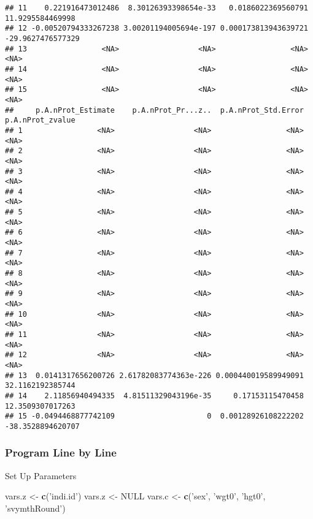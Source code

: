 \documentclass[
]{book}
\newenvironment{Shaded}{\begin{snugshade}}{\end{snugshade}}
\newcommand{\KeywordTok}[1]{\textcolor[rgb]{0.13,0.29,0.53}{\textbf{#1}}}
\newcommand{\NormalTok}[1]{#1}
\newcommand{\OtherTok}[1]{\textcolor[rgb]{0.56,0.35,0.01}{#1}}
\newcommand{\StringTok}[1]{\textcolor[rgb]{0.31,0.60,0.02}{#1}}
\begin{document}
\begin{verbatim}
## 11    0.221916473012486  8.30126393398654e-33   0.0186022369560791  11.9295584469998
## 12 -0.00520794333267238 3.00201194005694e-197 0.000173813943639721 -29.9627476577329
## 13                 <NA>                  <NA>                 <NA>              <NA>
## 14                 <NA>                  <NA>                 <NA>              <NA>
## 15                 <NA>                  <NA>                 <NA>              <NA>
##     p.A.nProt_Estimate    p.A.nProt_Pr...z..  p.A.nProt_Std.Error  p.A.nProt_zvalue
## 1                 <NA>                  <NA>                 <NA>              <NA>
## 2                 <NA>                  <NA>                 <NA>              <NA>
## 3                 <NA>                  <NA>                 <NA>              <NA>
## 4                 <NA>                  <NA>                 <NA>              <NA>
## 5                 <NA>                  <NA>                 <NA>              <NA>
## 6                 <NA>                  <NA>                 <NA>              <NA>
## 7                 <NA>                  <NA>                 <NA>              <NA>
## 8                 <NA>                  <NA>                 <NA>              <NA>
## 9                 <NA>                  <NA>                 <NA>              <NA>
## 10                <NA>                  <NA>                 <NA>              <NA>
## 11                <NA>                  <NA>                 <NA>              <NA>
## 12                <NA>                  <NA>                 <NA>              <NA>
## 13  0.0141317656200726 2.61782083774363e-226 0.000440019589949091  32.1162192385744
## 14    2.11856940494335  4.81511329043196e-35     0.17153115470458  12.3509307017263
## 15 -0.0494468877742109                     0  0.00128926108222202 -38.3528894620707
\end{verbatim}

\hypertarget{program-line-by-line}{%
\subsubsection{Program Line by Line}\label{program-line-by-line}}

Set Up Parameters

\begin{Shaded}
\begin{Highlighting}[]
\NormalTok{vars.z <-}\StringTok{ }\KeywordTok{c}\NormalTok{(}\StringTok{'indi.id'}\NormalTok{)}
\NormalTok{vars.z <-}\StringTok{ }\OtherTok{NULL}
\NormalTok{vars.c <-}\StringTok{ }\KeywordTok{c}\NormalTok{(}\StringTok{'sex'}\NormalTok{, }\StringTok{'wgt0'}\NormalTok{, }\StringTok{'hgt0'}\NormalTok{, }\StringTok{'svymthRound'}\NormalTok{)}
\end{Highlighting}
\end{Shaded}
\end{document}
